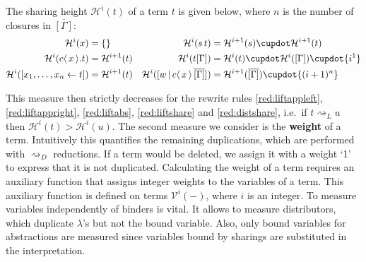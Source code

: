 \documentclass[runningheads]{llncs}
\let\vec\relax
\newcommand\defn{\textbf}
\newcommand{\set}[1]{ \{ #1 \} }
\newcommand{\app}[2]{#1 \, #2}
\newcommand{\fake}[3]{#1 \langle \, #2 \, \rangle . #3}
\newcommand{\share}[3]{#1 [#2 \leftarrow #3]}
\newcommand{\dist}[5]{#1 [ #2 \, \vert \, \fakedist{#4}{#5} \, #3 ]}
\newcommand{\fakedist}[2]{#1 \langle \, #2 \, \rangle}
\newcommand\vecdist[2]{\vec{#2}}
\newcommand{\height}[2]{\mathcal{H}^{#1}(#2)}
\newcommand{\weightvar}[2]{\mathcal{V}^{#1}(#2)}
\begin{document}
\begin{definition}
The sharing height $\height{i}{t}$ of a term $t$ is given below, where $n$ is the number of closures in $\overline{[\Gamma]}$:
\begingroup
\allowdisplaybreaks
\begin{align*}
	\height{i}{x} &= \set{} &
	\height{i}{ \app{s}{t} } &= \height{i+1}{s} \cupdot \height{i+1}{t} \\
	\height{i}{\fake{c}{\vec{x}}{t}} &= \height{i + 1}{t} &
	\height{i}{t[\Gamma]} &= \height{i}{t} \cupdot \height{i}{[\Gamma]} \cupdot \set{i^{1}} \\
	\height{i}{\share{}{x_{1}, \dots, x_{n}}{t}} &= \height{i+1}{t} &
	\height{i}{\dist{}{\vecdist{e}{\vec{w}}}{\overline{[\Gamma]}}{c}{\vec{x}}} &= \height{i + 1}{\overline{[\Gamma]}} \cupdot \set{(i + 1)^{n}} 
\end{align*}
\endgroup
\end{definition}

\noindent This measure then strictly decreases for the rewrite rules \ref{red:liftappleft}, \ref{red:liftappright}, \ref{red:liftabs}, \ref{red:liftshare} and \ref{red:distshare}, i.e.\ if $t \rightsquigarrow_{L} u$ then $\height{i}{t} > \height{i}{u}$. The second measure we consider is the \defn{weight} of a term. Intuitively this quantifies the remaining duplications, which are performed with $\rightsquigarrow_{D}$ reductions. If a term would be deleted, we assign it with a weight `1' to express that it is not duplicated. Calculating the weight of a term requires an auxiliary function that assigns integer weights to the variables of a term. This auxiliary function is defined on terms $\weightvar{i}{-}$, where $i$ is an integer. To measure variables independently of binders is vital. It allows to measure distributors, which duplicate $\lambda$'s but not the bound variable. Also, only bound variables for abstractions are measured since variables bound by sharings are substituted in the interpretation.
\end{document}
